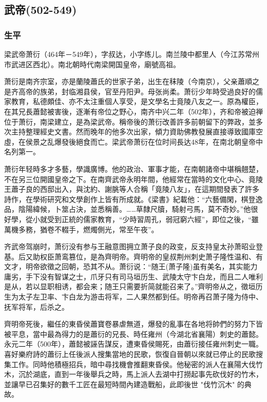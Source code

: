 
\subsection{武帝\tiny(502-549)}

\subsubsection{生平}

梁武帝萧衍（464年－549年），字叔达，小字练儿。南兰陵中都里人（今江苏常州市武进区西北）。南北朝時代南梁開国皇帝，廟號高祖。

萧衍是南齐宗室，亦是蘭陵蕭氏的世家子弟，出生在秣陵（今南京），父亲蕭順之是齐高帝的族弟，封临湘县侯，官至丹阳尹。母张尚柔。萧衍少年時受過良好的儒家教育，私德頗佳、亦不太注重個人享受，是文學名士竟陵八友之一。原為權臣，在其兄長蕭懿被害後，逐漸有帝位之野心，南齐中兴二年（502年），齐和帝被迫禅位于萧衍，南梁建立，是為梁武帝。稱帝後的萧衍改善許多前朝留下的弊政，並多次主持整理經史文書。然而晚年的他多次出家，傾力資助佛教發展直接導致國庫空虛，在侯景之乱爆發後絕食而亡。梁武帝萧衍在位时间長达48年，在南北朝皇帝中名列第一。

萧衍年轻時多才多藝，學識廣博。他的政治、軍事才能，在南朝諸帝中堪稱翹楚，不在另三位開國皇帝之下。在南齊武帝永明年間，他經常在當時的文化中心、竟陵王蕭子良的西邸出入，與沈約、謝脁等人合稱「竟陵八友」，在這期間發表了許多詩作，在學術研究和文學創作上皆有所成就。《梁書》紀載他：“六藝備閑，棋登逸品，陰陽緯候，卜筮占決，並悉稱善。……草隸尺牘，騎射弓馬，莫不奇妙。”他很好學，從小就受到正統的儒家教育，“少時習周孔，弱冠窮六經”，即位之後，“雖萬機多務，猶卷不輟手，燃燭側光，常至午夜”。

齐武帝驾崩时，萧衍没有参与王融意图拥立萧子良的政变，反支持皇太孙萧昭业登基。后又助权臣萧鸾篡位，是為齊明帝。齊明帝的皇叔荆州刺史萧子隆性温和、有文才，明帝欲徵之回朝，恐其不从。萧衍说：“随王(萧子隆)虽有美名，其实能力庸劣，手下没有智谋之士，爪牙只有司马垣历生、武陵太守卞白龙，而且二人唯利是从，若以显职相诱，都会来；随王只需要折简就能召来了。”齊明帝从之，徵垣历生为太子左卫率、卞白龙为游击将军，二人果然都到任。明帝再召萧子隆为侍中、抚军将军，后杀之。

齊明帝死後，繼任的東昏侯蕭寶卷暴虐無道，爆發的亂事在各地将帥們的努力下皆被平息，當中最為得力的是蕭衍的兄長、時任雍州（今湖北省襄陽）刺史的蕭懿。永元二年（500年），蕭懿被誣告謀反，遭東昏侯賜死，由蕭衍接任雍州刺史一職。喜好樂府詩的蕭衍上任後派人搜集當地的民歌，恢復自晉朝以來就已停止的民歌搜集工作。同時他積極招兵，暗中尋找機會推翻東昏侯。他秘密的派人在襄陽大伐竹木，沉於湖底，直到一年後舉兵之時，馬上派人去湖中打撈起事先砍伐好的竹木，並讓早已召集好的數千工匠在最短時間內建造戰船，此即後世 "伐竹沉木" 的典故。

